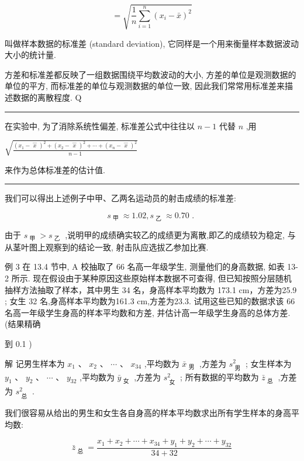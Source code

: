 \documentclass[10pt]{article}
\newcommand{\HRule}{\begin{center}\rule{0.9\linewidth}{0.2mm}\end{center}}
\begin{document}
\[
= \sqrt{\frac{1}{n}\mathop{\sum }\limits_{{i = 1}}^{n}{\left( {x}_{i} - \bar{x}\right) }^{2}}
\]

叫做样本数据的标准差 (standard deviation), 它同样是一个用来衡量样本数据波动大小的统计量.

方差和标准差都反映了一组数据围绕平均数波动的大小, 方差的单位是观测数据的单位的平方, 而标准差的单位与观测数据的单位一致, 因此我们常常用标准差来描述数据的离散程度. Q

\HRule

在实验中, 为了消除系统性偏差, 标准差公式中往往以 \(n - 1\) 代替 \(n\) ,用

\(\sqrt{\frac{{\left( {x}_{1} - \overset{\text{ ― }}{x}\right) }^{2} + {\left( {x}_{2} - \overset{\text{ ― }}{x}\right) }^{2} + \cdots  + {\left( {x}_{n} - \overset{\text{ ― }}{x}\right) }^{2}}{n - 1}}\)

来作为总体标准差的估计值.

\HRule

我们可以得出上述例子中甲、乙两名运动员的射击成绩的标准差:

\[
{s}_{\text{ 甲 }} \approx  {1.02},{s}_{\text{ 乙 }} \approx  {0.70}\text{ . }
\]

由于 \({s}_{\text{ 甲 }} > {s}_{\text{ 乙 }}\) ,说明甲的成绩确实较乙的成绩更为离散,即乙的成绩较为稳定, 与从茎叶图上观察到的结论一致, 射击队应选拔乙参加比赛.

例 3 在 13.4 节中, A 校抽取了 66 名高一年级学生, 测量他们的身高数据, 如表 13-2 所示. 现在假设由于某种原因这些原始样本数据不可查得, 但已知按照分层随机抽样方法抽取了样本，其中男生 34 名，身高样本平均数为 173.1 cm，方差为25.9 ; 女生 32 名,身高样本平均数为161.3 cm,方差为23.3. 试用这些已知的数据求该 66 名高一年级学生身高的样本平均数和方差, 并估计高一年级学生身高的总体方差. (结果精确





到 0.1 )

解 记男生样本为 \({x}_{1}\text{ 、 }{x}_{2}\text{ 、 }\cdots \text{ 、 }{x}_{34}\) ,平均数为 \({\bar{x}}_{\text{ 男 }}\) ,方差为 \({s}_{\text{ 男 }}^{2}\) ; 女生样本为 \({y}_{1}\text{ 、 }{y}_{2}\text{ 、 }\cdots \text{ 、 }{y}_{32}\) ,平均数为 \({\bar{y}}_{\text{ 女 }}\) ,方差为 \({s}_{\text{ 女 }}^{2}\) ; 所有数据的平均数为 \({\bar{z}}_{\text{ 总 }}\) ,方差为 \({s}_{\text{ 总 }}^{2}\) .

我们很容易从给出的男生和女生各自身高的样本平均数求出所有学生样本的身高平均数:

\[
{\bar{z}}_{\text{ 总 }} = \frac{{x}_{1} + {x}_{2} + \cdots  + {x}_{34} + {y}_{1} + {y}_{2} + \cdots  + {y}_{32}}{{34} + {32}}
\]
\end{document}
